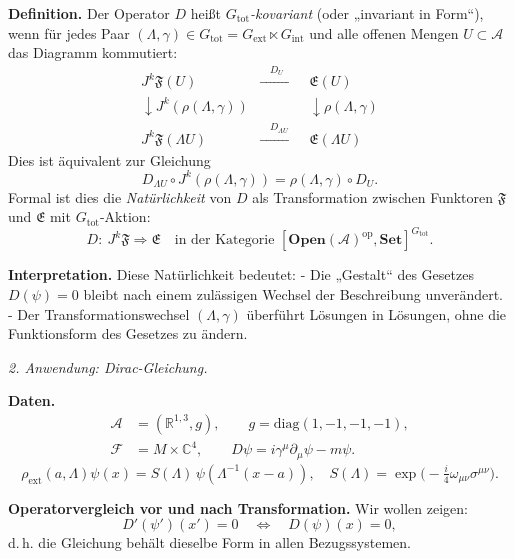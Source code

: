 \documentclass[10pt, letterpaper]{article}
\newcommand{\R}{\mathbb{R}}
\newcommand{\C}{\mathbb{C}}
\begin{document}
\textbf{Definition.}
Der Operator $D$ heißt \emph{$G_{\mathrm{tot}}$-kovariant} (oder „invariant in Form“),
wenn für jedes Paar $(\Lambda,\gamma)\in G_{\mathrm{tot}}=G_{\mathrm{ext}}\ltimes G_{\mathrm{int}}$
und alle offenen Mengen $U\subset\mathcal A$ das Diagramm kommutiert:
\[
\begin{array}{ccc}
J^k\mathfrak F(U) & \xrightarrow{\quad D_U\quad} & \mathfrak E(U)\\[0.4em]
\downarrow J^k(\rho(\Lambda,\gamma)) & & \downarrow \rho(\Lambda,\gamma)\\[0.4em]
J^k\mathfrak F(\Lambda U) & \xrightarrow{\quad D_{\Lambda U}\quad} & \mathfrak E(\Lambda U)
\end{array}
\]
Dies ist äquivalent zur Gleichung
\[
D_{\Lambda U}\circ J^k(\rho(\Lambda,\gamma))
= \rho(\Lambda,\gamma)\circ D_U.
\]
Formal ist dies die \emph{Natürlichkeit} von $D$ als Transformation
zwischen Funktoren $\mathfrak F$ und $\mathfrak E$ mit $G_{\mathrm{tot}}$-Aktion:
\[
D:\ J^k\mathfrak F\Rightarrow \mathfrak E
\quad\text{in der Kategorie } [\mathbf{Open}(\mathcal A)^{\mathrm{op}},\mathbf{Set}]^{G_{\mathrm{tot}}}.
\]

\textbf{Interpretation.}
Diese Natürlichkeit bedeutet:
- Die „Gestalt“ des Gesetzes $D(\psi)=0$ bleibt nach einem zulässigen
  Wechsel der Beschreibung unverändert.
- Der Transformationswechsel $(\Lambda,\gamma)$ überführt Lösungen in Lösungen,
  ohne die Funktionsform des Gesetzes zu ändern.

\bigskip
\emph{2. Anwendung: Dirac-Gleichung.}

\textbf{Daten.}
\begin{align*}
\mathcal A &= (\R^{1,3},g),\qquad g=\mathrm{diag}(1,-1,-1,-1),\\
\mathcal F &= M\times\C^4,\qquad
D\psi = i\gamma^\mu\partial_\mu\psi - m\psi.
\end{align*}
\[
\rho_{\mathrm{ext}}(a,\Lambda)\psi(x)
= S(\Lambda)\,\psi(\Lambda^{-1}(x-a)),
\quad
S(\Lambda)=\exp\!\Big(-\tfrac{i}{4}\omega_{\mu\nu}\sigma^{\mu\nu}\Big).
\]

\textbf{Operatorvergleich vor und nach Transformation.}
Wir wollen zeigen:
\[
D'(\psi')(x') = 0 \quad\Longleftrightarrow\quad D(\psi)(x)=0,
\]
d.\,h. die Gleichung behält dieselbe Form in allen Bezugssystemen.
\end{document}
